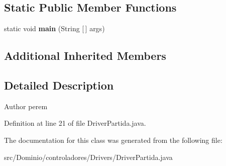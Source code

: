 \subsection*{Static Public Member Functions}
\begin{DoxyCompactItemize}
\item 
\mbox{\label{class_dominio_1_1controladores_1_1_drivers_1_1_driver_partida_a31b15a500be1892e96d81c271adffacb}} 
static void {\bfseries main} (String [$\,$] args)
\end{DoxyCompactItemize}
\subsection*{Additional Inherited Members}


\subsection{Detailed Description}
\begin{DoxyAuthor}{Author}
perem 
\end{DoxyAuthor}


Definition at line 21 of file Driver\+Partida.\+java.



The documentation for this class was generated from the following file\+:\begin{DoxyCompactItemize}
\item 
src/\+Dominio/controladores/\+Drivers/Driver\+Partida.\+java\end{DoxyCompactItemize}
